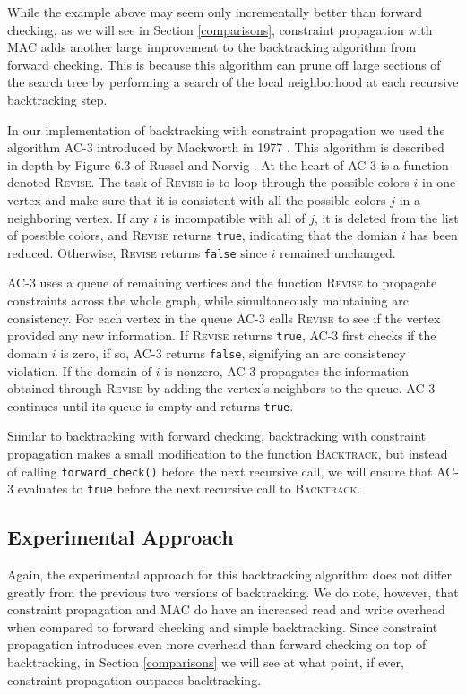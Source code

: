 \documentclass{article}
\begin{document}
		While the example above may seem only incrementally better than forward checking, as we will see in Section \ref{comparisons}, constraint propagation with MAC adds another large improvement to the backtracking algorithm from forward checking. This is because this algorithm can prune off large sections of the search tree by performing a search of the local neighborhood at each recursive backtracking step.
		
		In our implementation of backtracking with constraint propagation we used the algorithm AC-3 introduced by Mackworth in 1977 \cite{mackworth}. This algorithm is described in depth by Figure 6.3 of Russel and Norvig \cite{ai}.  At the heart of AC-3 is a function denoted \textsc{Revise}. The task of \textsc{Revise} is to loop through the possible colors $i$ in one vertex and make sure that it is consistent with all the possible colors $j$ in a neighboring vertex. If any $i$ is incompatible with all of $j$, it is deleted from the list of possible colors, and \textsc{Revise} returns \texttt{true}, indicating that the domian $i$ has been reduced. Otherwise, \textsc{Revise} returns \texttt{false} since $i$ remained unchanged.
		
		AC-3 uses a queue of remaining vertices and the function \textsc{Revise} to propagate constraints across the whole graph, while simultaneously maintaining arc consistency. For each vertex in the queue AC-3 calls \textsc{Revise} to see if the vertex provided any new information. If \textsc{Revise} returns \texttt{true}, AC-3 first checks if the domain $i$ is zero, if so, AC-3 returns \texttt{false}, signifying an arc consistency violation. If the domain of $i$ is nonzero, AC-3 propagates the information obtained through \textsc{Revise} by adding the vertex's neighbors to the queue. AC-3 continues until its queue is empty and returns \texttt{true}.
		
		Similar to backtracking with forward checking, backtracking with constraint propagation makes a small modification to the function \textsc{Backtrack}, but instead of calling \texttt{forward\_check()} before the next recursive call, we will ensure that AC-3 evaluates to \texttt{true} before the next recursive call to \textsc{Backtrack}.
	\subsection{Experimental Approach}
	
		Again, the experimental approach for this backtracking algorithm does not differ greatly from the previous two versions of backtracking. We do note, however, that constraint propagation and MAC do have an increased read and write overhead when compared to forward checking and simple backtracking. Since constraint propagation introduces even more overhead than forward checking on top of backtracking, in Section \ref{comparisons} we will see at what point, if ever, constraint propagation outpaces backtracking.
	
\end{document}
